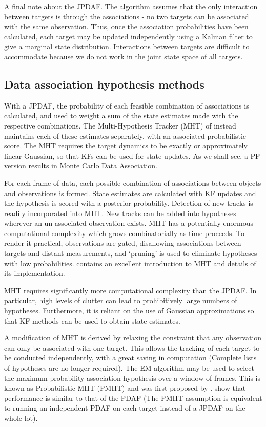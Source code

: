 A final note about the JPDAF. The algorithm assumes that the only interaction between targets is through the associations - no two targets can be associated with the same observation. Thus, once the association probabilities have been calculated, each target may be updated independently using a Kalman filter to give a marginal state distribution. Interactions between targets are difficult to accommodate because we do not work in the joint state space of all targets.



\subsection{Data association hypothesis methods}
With a JPDAF, the probability of each feasible combination of associations is calculated, and used to weight a sum of the state estimates made with the respective combinations. The Multi-Hypothesis Tracker (MHT) of \cite{Reid1979} instead maintains each of these estimates separately, with an associated probabilistic score. The MHT requires the target dynamics to be exactly or approximately linear-Gaussian, so that KFs can be used for state updates. As we shall see, a PF version results in Monte Carlo Data Association.

For each frame of data, each possible combination of associations between objects and observations is formed. State estimates are calculated with KF updates and the hypothesis is scored with a posterior probability. Detection of new tracks is readily incorporated into MHT. New tracks can be added into hypotheses wherever an un-associated observation exists. MHT has a potentially enormous computational complexity which grows combinatorially as time proceeds. To render it practical, observations are gated, disallowing associations between targets and distant measurements, and `pruning' is used to eliminate hypotheses with low probabilities. \cite{Blackman2004} contains an excellent introduction to MHT and details of its implementation.

MHT requires significantly more computational complexity than the JPDAF. In particular, high levels of clutter can lead to prohibitively large numbers of hypotheses. Furthermore, it is reliant on the use of Gaussian approximations so that KF methods can be used to obtain state estimates. 

A modification of MHT is derived by relaxing the constraint that any observation can only be associated with one target. This allows the tracking of each target to be conducted independently, with a great saving in computation (Complete lists of hypotheses are no longer required). The EM algorithm may be used to select the maximum probability association hypothesis over a window of frames. This is known as Probabilistic MHT (PMHT) and was first proposed by \cite{Streit1994}. \cite{Willett2002} show that performance is similar to that of the PDAF (The PMHT assumption is equivalent to running an independent PDAF on each target instead of a JPDAF on the whole lot).

